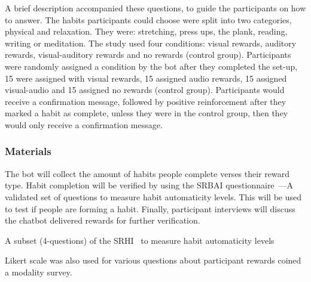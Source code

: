 \documentclass{scaffold/sigchi}
\begin{document}
A brief description accompanied these questions, to guide the participants on how to answer. The habits participants could choose were split into two categories, physical and relaxation. They were: stretching, press ups, the plank, reading, writing or meditation.\newline
\newline
The study used four conditions: visual rewards, auditory rewards, visual-auditory rewards and no rewards (control group). Participants were randomly assigned a condition by the bot after they completed the set-up, 15 were assigned with visual rewards, 15 assigned audio rewards, 15 assigned visual-audio and 15 assigned no rewards (control group).\newline
\newline
Participants would receive a confirmation message, followed by positive reinforcement after they marked a habit as complete, unless they were in the control group, then they would only receive a confirmation message.


\subsubsection{Materials}
The bot will collect the amount of habits people complete verses their reward type. Habit completion will be verified by using the SRBAI questionnaire~\cite{article_habit_measurement}---A validated set of questions to measure habit automaticity levels. This will be used to test if people are forming a habit. Finally, participant interviews will discuss the chatbot delivered rewards for further verification.

A subset (4-questions) of the SRHI~\cite{article_habit_strength}  to measure habit automaticity levels

Likert scale was also used for various questions about participant rewards coined a modality survey.
 
\end{document}
